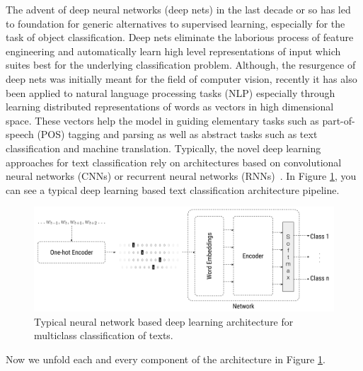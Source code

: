 The advent of deep neural networks (deep nets) in the last decade or so has led to foundation for generic alternatives to supervised learning, especially for the task of object classification. Deep nets eliminate the laborious process of feature engineering and automatically learn high level representations of input which suites best for the underlying classification problem. Although, the resurgence of deep nets was initially meant for the field of computer vision, recently it has also been applied to natural language processing tasks (NLP)\cite{bengio2003neural, collobert2008unified, mikolov2013distributed} especially through learning distributed representations of words as vectors in high dimensional space. These vectors help the model in guiding elementary tasks such as part-of-speech (POS) tagging and parsing as well as abstract tasks such as text classification and machine translation. Typically, the novel deep learning approaches for text classification rely on architectures based on convolutional neural networks (CNNs) or recurrent neural networks (RNNs)~\cite{young2018recent}. In Figure \ref{fig:dlarch}, you can see a typical deep learning based text classification architecture pipeline.





\begin{figure}[!htb]
    \centering
    \includegraphics[scale=0.4]{Figures/text-classification-diagram.png}
    \caption{Typical neural network based deep learning architecture for multiclass classification of texts.}
    \label{fig:dlarch}
\end{figure}


Now we unfold each and every component of the architecture in Figure \ref{fig:dlarch}. 


